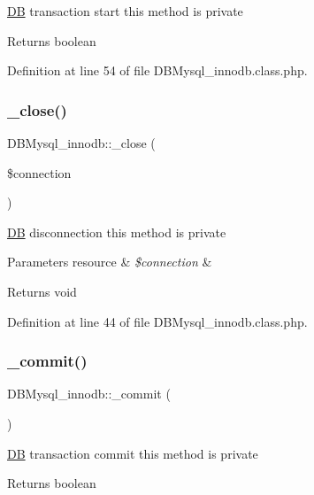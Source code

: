 \hyperlink{classDB}{DB} transaction start this method is private \begin{DoxyReturn}{Returns}
boolean 
\end{DoxyReturn}


Definition at line 54 of file D\+B\+Mysql\+\_\+innodb.\+class.\+php.

\hypertarget{classDBMysql__innodb_a006f982aef8b7fd2909d3912e0afb032}{}\label{classDBMysql__innodb_a006f982aef8b7fd2909d3912e0afb032} 
\subsubsection{\texorpdfstring{\+\_\+close()}{\_close()}}
{\footnotesize\ttfamily D\+B\+Mysql\+\_\+innodb\+::\+\_\+close (\begin{DoxyParamCaption}\item[{}]{\$connection }\end{DoxyParamCaption})}

\hyperlink{classDB}{DB} disconnection this method is private 
\begin{DoxyParams}[1]{Parameters}
resource & {\em \$connection} & \\
\hline
\end{DoxyParams}
\begin{DoxyReturn}{Returns}
void 
\end{DoxyReturn}


Definition at line 44 of file D\+B\+Mysql\+\_\+innodb.\+class.\+php.

\hypertarget{classDBMysql__innodb_a9ffbd5a0d262ae7dd7fb840822a7e543}{}\label{classDBMysql__innodb_a9ffbd5a0d262ae7dd7fb840822a7e543} 
\subsubsection{\texorpdfstring{\+\_\+commit()}{\_commit()}}
{\footnotesize\ttfamily D\+B\+Mysql\+\_\+innodb\+::\+\_\+commit (\begin{DoxyParamCaption}{ }\end{DoxyParamCaption})}

\hyperlink{classDB}{DB} transaction commit this method is private \begin{DoxyReturn}{Returns}
boolean 
\end{DoxyReturn}


